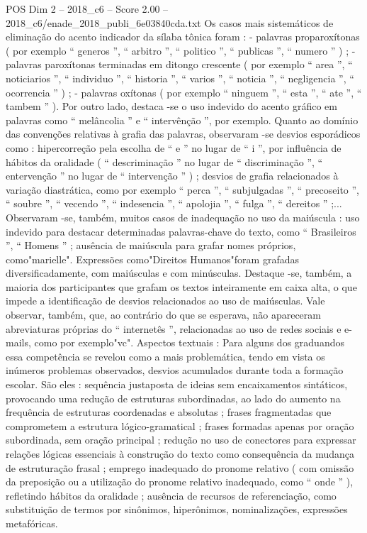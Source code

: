 \begin{textsample}{POS Dim 2 – 2018\_c6 – Score 2.00 – 2018\_c6/enade\_2018\_publi\_6e03840cda.txt}
Os casos mais sistemáticos de eliminação do acento indicador da sílaba tônica foram : - palavras proparoxítonas ( por exemplo “ generos ”, “ arbitro ”, “ politico ”, “ publicas ”, “ numero ” ) ; - palavras paroxítonas terminadas em ditongo crescente ( por exemplo “ area ”, “ noticiarios ”, “ individuo ”, “ historia ”, “ varios ”, “ noticia ”, “ negligencia ”, “ ocorrencia ” ) ; - palavras oxítonas ( por exemplo “ ninguem ”, “ esta ”, “ ate ”, “ tambem ” ).
Por outro lado, destaca -se o uso indevido do acento gráfico em palavras como “ melâncolia ” e “ intervênção ”, por exemplo.
Quanto ao domínio das convenções relativas à grafia das palavras, observaram -se desvios esporádicos como : hipercorreção pela escolha de “ e ” no lugar de “ i ”, por influência de hábitos da oralidade ( “ descriminação ” no lugar de “ discriminação ”, “ entervenção ” no lugar de “ intervenção ” ) ; desvios de grafia relacionados à variação diastrática, como por exemplo “ perca ”, “ subjulgadas ”, “ precoseito ”, “ soubre ”, “ vecendo ”, “ indesencia ”, “ apolojia ”, “ fulga ”, “ dereitos ” ;...
Observaram -se, também, muitos casos de inadequação no uso da maiúscula : uso indevido para destacar determinadas palavras-chave do texto, como “ Brasileiros ”, “ Homens ” ; ausência de maiúscula para grafar nomes próprios, como"marielle".
Expressões como"Direitos Humanos"foram grafadas diversificadamente, com maiúsculas e com minúsculas.
Destaque -se, também, a maioria dos participantes que grafam os textos inteiramente em caixa alta, o que impede a identificação de desvios relacionados ao uso de maiúsculas.
Vale observar, também, que, ao contrário do que se esperava, não apareceram abreviaturas próprias do “ internetês ”, relacionadas ao uso de redes sociais e e-mails, como por exemplo"vc".
Aspectos textuais : Para alguns dos graduandos essa competência se revelou como a mais problemática, tendo em vista os inúmeros problemas observados, desvios acumulados durante toda a formação escolar.
São eles : sequência justaposta de ideias sem encaixamentos sintáticos, provocando uma redução de estruturas subordinadas, ao lado do aumento na frequência de estruturas coordenadas e absolutas ; frases fragmentadas que comprometem a estrutura lógico-gramatical ; frases formadas apenas por oração subordinada, sem oração principal ; redução no uso de conectores para expressar relações lógicas essenciais à construção do texto como consequência da mudança de estruturação frasal ; emprego inadequado do pronome relativo ( com omissão da preposição ou a utilização do pronome relativo inadequado, como “ onde ” ), refletindo hábitos da oralidade ; ausência de recursos de referenciação, como substituição de termos por sinônimos, hiperônimos, nominalizações, expressões metafóricas.

\end{textsample}
